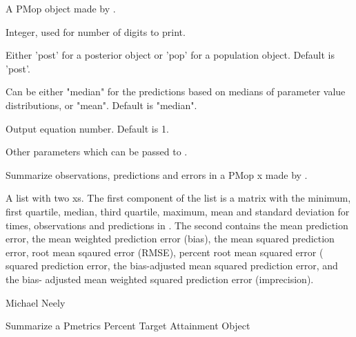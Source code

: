 \documentclass[a4paper]{book}
\begin{document}
\begin{Arguments}
\begin{ldescription}
\item[\code{x}] A PMop object made by .

\item[\code{digits}] Integer, used for number of digits to print.

\item[\code{pred.type}] Either 'post' for a posterior object or 'pop' for a population object.  Default is 'post'.

\item[\code{icen}] Can be either "median" for the predictions based on medians of  parameter value
distributions, or "mean".  Default is "median".

\item[\code{outeq}] Output equation number.  Default is 1.

\item[\code{...}] Other parameters which can be passed to .
\end{ldescription}
\end{Arguments}
%
\begin{Details}\relax
Summarize observations, predictions and errors in a PMop x made by .
\end{Details}
%
\begin{Value}
A list with two xs.  The first component of the list is a
matrix with the minimum, first quartile, median, third quartile, maximum,
mean and standard deviation for times, observations and predictions in .
The second contains the mean prediction error,
the mean weighted prediction error (bias), the mean squared prediction error, root mean sqaured error (RMSE),
percent root mean squared error (
squared prediction error, the bias-adjusted mean squared prediction error, and the bias-
adjusted mean weighted squared prediction error (imprecision).
\end{Value}
%
\begin{Author}\relax
Michael Neely
\end{Author}
%
\begin{SeeAlso}\relax
{}
\end{SeeAlso}
%
\begin{Description}\relax
Summarize a Pmetrics Percent Target Attainment Object
\end{Description}
\end{document}
